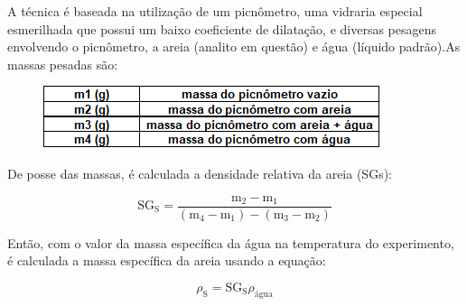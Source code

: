 A técnica é baseada na utilização de um picnômetro, uma vidraria especial esmerilhada que possui um baixo coeficiente de dilatação, e diversas pesagens envolvendo o picnômetro, a areia (analito em questão) e água (líquido padrão).As massas pesadas são:

\begin{figure}[H]
	\begin{center}
		\includegraphics[scale=.8, trim={0 0 0 0}]{figuras/ladeq/fluid/fig5}
		\label{fig5}
	\end{center}
\end{figure}

De posse das massas, é calculada a densidade relativa da areia (SGs):

\begin{equation}\label{key}
\mathrm{SG}_{\mathrm{S}}=\frac{\mathrm{m}_{2}-\mathrm{m}_{1}}{\left(\mathrm{m}_{4}-\mathrm{m}_{1}\right)-\left(\mathrm{m}_{3}-\mathrm{m}_{2}\right)}
\end{equation}


Então, com o valor da massa específica da água na temperatura do experimento, é calculada a massa específica da areia usando a equação:

\begin{equation}\label{key}
\rho_{\mathrm{S}}=\mathrm{SG}_{\mathrm{S}} \rho_{\mathrm{água}}
\end{equation}



